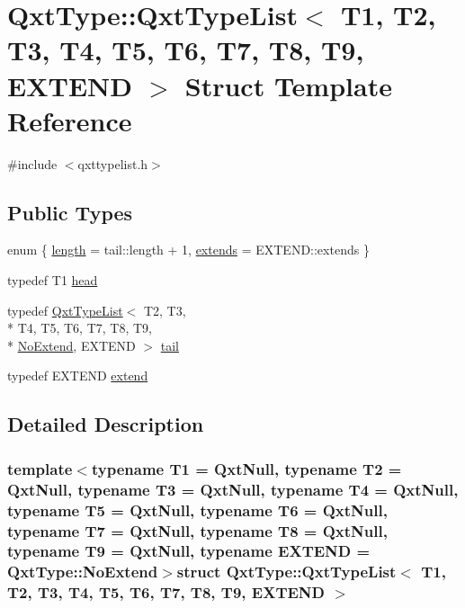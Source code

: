 \hypertarget{struct_qxt_type_1_1_qxt_type_list}{\section{Qxt\-Type\-:\-:Qxt\-Type\-List$<$ T1, T2, T3, T4, T5, T6, T7, T8, T9, E\-X\-T\-E\-N\-D $>$ Struct Template Reference}
\label{struct_qxt_type_1_1_qxt_type_list}
}


{\ttfamily \#include $<$qxttypelist.\-h$>$}

\subsection*{Public Types}
\begin{DoxyCompactItemize}
\item 
enum \{ \hyperlink{struct_qxt_type_1_1_qxt_type_list_a361a0270ee620e3254cff4d44b1257eea0ece857538d32b4c389bd949fa3b4ab5}{length} = tail\-:\-:length + 1, 
\hyperlink{struct_qxt_type_1_1_qxt_type_list_a361a0270ee620e3254cff4d44b1257eeac060a2fd27c392b65da3ba4654a37c86}{extends} = E\-X\-T\-E\-N\-D\-:\-:extends
 \}
\item 
typedef T1 \hyperlink{struct_qxt_type_1_1_qxt_type_list_aa7da5ad3445f29c6e415dd4a2e91517a}{head}
\item 
typedef \hyperlink{struct_qxt_type_1_1_qxt_type_list}{Qxt\-Type\-List}$<$ T2, T3, \\*
T4, T5, T6, T7, T8, T9, \\*
\hyperlink{struct_qxt_type_1_1_no_extend}{No\-Extend}, E\-X\-T\-E\-N\-D $>$ \hyperlink{struct_qxt_type_1_1_qxt_type_list_a922bd829f1beb1a71f69e5a11f1a255c}{tail}
\item 
typedef E\-X\-T\-E\-N\-D \hyperlink{struct_qxt_type_1_1_qxt_type_list_addaedde1404fa60e560a11eaeaef29ee}{extend}
\end{DoxyCompactItemize}


\subsection{Detailed Description}
\subsubsection*{template$<$typename T1 = Qxt\-Null, typename T2 = Qxt\-Null, typename T3 = Qxt\-Null, typename T4 = Qxt\-Null, typename T5 = Qxt\-Null, typename T6 = Qxt\-Null, typename T7 = Qxt\-Null, typename T8 = Qxt\-Null, typename T9 = Qxt\-Null, typename E\-X\-T\-E\-N\-D = Qxt\-Type\-::\-No\-Extend$>$struct Qxt\-Type\-::\-Qxt\-Type\-List$<$ T1, T2, T3, T4, T5, T6, T7, T8, T9, E\-X\-T\-E\-N\-D $>$}



